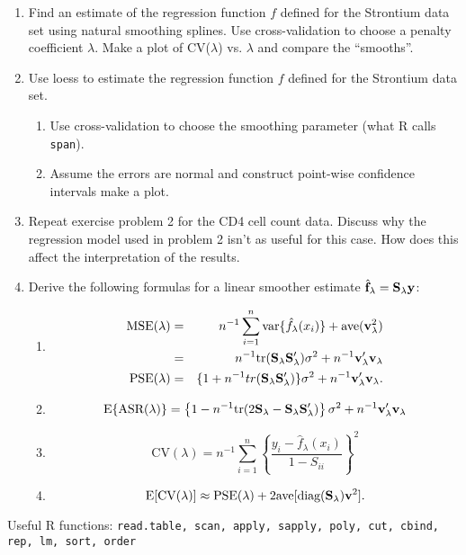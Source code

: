 \documentclass[12pt]{article}
\begin{document}
\begin{enumerate}
\item Find an estimate of the regression function $f$ defined for the
  Strontium data set using natural smoothing
  splines. Use cross-validation to choose a penalty coefficient
  $\lambda$. Make a plot of
  CV($\lambda$) vs. $\lambda$ and compare the ``smooths''.
\item Use loess to estimate the regression function $f$ defined for
  the Strontium data set. 
\begin{enumerate}
\item Use cross-validation to choose the smoothing
  parameter (what R calls {\tt span}).
\item Assume the errors are normal and construct point-wise confidence
  intervals make a plot.
\end{enumerate}
\item Repeat exercise problem 2 for the CD4 cell count data. Discuss
  why the regression model used in problem 2 isn't as useful for this
  case. How does this affect the interpretation of the results.
\item Derive the following formulas for a linear smoother estimate $\hat{{\mathbf f}}_{\lambda}={\mathbf S}_{\lambda}{\mathbf y}$:
\begin{enumerate}
\item
\begin{eqnarray*}
\mbox{MSE}(\lambda) &=& n^{-1} \sum_{i=1}^n
\mbox{var}\{\hat{f}_{\lambda}(x_i)\} + \mbox{ave} ( {\mathbf v}_{\lambda}^2 ) \\
&=& n^{-1}\mbox{tr}({\mathbf S}_{\lambda}{\mathbf S}_{\lambda}') \sigma^2 + n^{-1}
{\mathbf v}_{\lambda}'{\mathbf v}_{\lambda}\\
\mbox{PSE}(\lambda) &=& \{1 + n^{-1} tr({\mathbf S}_{\lambda}{\mathbf S}_{\lambda}')
\} \sigma^2 +  n^{-1}
{\mathbf v}_{\lambda}'{\mathbf v}_{\lambda}.
\end{eqnarray*}
\item
\[
\mbox{E}\{\mbox{ASR}(\lambda)\} = \left\{ 1 - n^{-1}\mbox{tr}(2{\mathbf S}_{\lambda} -
    {\mathbf S}_{\lambda} {\mathbf S}_{\lambda}') \right\} \sigma^2 + n^{-1}
    {\mathbf v}_{\lambda}'{\mathbf v}_{\lambda}
\]
\item 
\[
\mbox{CV}(\lambda) = n^{-1} \sum_{i=1}^n  \left\{ \frac{ y_i -
  \hat{f}_{\lambda}(x_i)}{1 - S_{ii}} \right\}^2
\]
\item
\[
\mbox{E}[\mbox{CV}(\lambda)] \approx \mbox{PSE}(\lambda) + 2
\mbox{ave}[\mbox{diag}({\mathbf S}_{\lambda}) {\mathbf v}^2].
\]
\end{enumerate}
\end{enumerate}

\noindent Useful R functions: 
{\tt read.table, scan, apply, sapply, poly, cut, cbind, rep, lm, sort, order}
\end{document}
